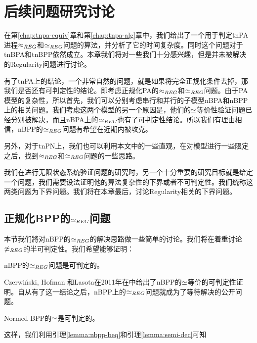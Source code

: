 \chapter{后续问题研究讨论}
\label{chap:fut}

在第\ref{chap:tnpa-equiv}章和第\ref{chap:tnpa-alg}章中，我们给出了一个用于判定tnPA进程$\approx_{REG}$和$\simeq_{REG}$问题的算法，并分析了它的时间复杂度。同时这个问题对于tnBPA和tnBPP依然成立。本章我们将对一些我们十分感兴趣，但是并未被解决的Regularity问题进行讨论。

有了tnPA上的结论，一个非常自然的问题，就是如果将完全正规化条件去掉，那我们是否还有可判定性的结论。即考虑正规化PA的$\approx_{REG}$和$\simeq_{REG}$问题。由于PA模型的复杂性，所以首先，我们可以分别考虑串行和并行的子模型nBPA和nBPP上的相关问题。我们考虑这两个模型的另一个原因是，他们的$\simeq$等价性验证问题已经分别被解决\cite{CzerwiAski2011,Fu2013}，而且nBPA上的$\simeq_{REG}$也有了可判定性结论\cite{Fu2013}。所以我们有理由相信，nBPP的$\simeq_{REG}$问题有希望在近期内被攻克。

另外，对于tnPN上，我们也可以利用本文中的一些直观，在对模型进行一些限定之后，找到$\approx_{REG}$和$\simeq_{REG}$问题的一些思路。

我们在进行无限状态系统验证问题的研究时，另一个十分重要的研究目标就是给定一个问题，我们需要设法证明他的算法复杂性的下界或者不可判定性。我们统称这两类问题为下界问题。我们将在本章最后，讨论Regularity相关的下界问题。

\section{正规化BPP的$\simeq_{REG}$问题}
\label{sec:nbpp}

本节我们將对nBPP的$\simeq_{REG}$的解决思路做一些简单的讨论。我们将在着重讨论$\not\simeq_{REG}$的半可判定性。我们希望能够证明：

\begin{conj}\label{conj:nbpp-reg}
nBPP的$\simeq_{REG}$问题是可判定的。
\end{conj}

Czerwi{\'n}ski, Hofman 和Lasota在2011年在\cite{CzerwiAski2011}中给出了nBPP的$\simeq$等价的可判定性证明。自从有了这一结论之后，nBPP上的$\simeq_{REG}$问题就成为了等待解决的公开问题。

\begin{lem}\label{lemma:nbpp-beq}
Normed BPP的$\simeq$是可判定的。
\end{lem}

这样，我们利用引理\ref{lemma:nbpp-beq}和引理\ref{lemma:semi-dec}可知

